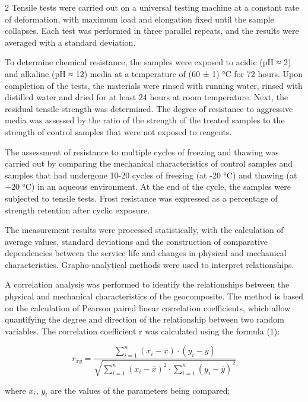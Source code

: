 \begin{multicols}{2}
Tensile tests were carried out on a universal testing machine at a
constant rate of deformation, with maximum load and elongation fixed
until the sample collapses. Each test was performed in three parallel
repeats, and the results were averaged with a standard deviation.

To determine chemical resistance, the samples were exposed to acidic (pH
≈ 2) and alkaline (pH ≈ 12) media at a temperature of (60 ± 1) °C for 72
hours. Upon completion of the tests, the materials were rinsed with
running water, rinsed with distilled water and dried for at least 24
hours at room temperature. Next, the residual tensile strength was
determined. The degree of resistance to aggressive media was assessed by
the ratio of the strength of the treated samples to the strength of
control samples that were not exposed to reagents.

The assessment of resistance to multiple cycles of freezing and thawing
was carried out by comparing the mechanical characteristics of control
samples and samples that had undergone 10-20 cycles of freezing (at -20
°C) and thawing (at +20 °C) in an aqueous environment. At the end of the
cycle, the samples were subjected to tensile tests. Frost resistance was
expressed as a percentage of strength retention after cyclic exposure.

The measurement results were processed statistically, with the
calculation of average values, standard deviations and the construction
of comparative dependencies between the service life and changes in
physical and mechanical characteristics. Grapho-analytical methods were
used to interpret relationships.

A correlation analysis was performed to identify the relationships
between the physical and mechanical characteristics of the geocomposite.
The method is based on the calculation of Pearson paired linear
correlation coefficients, which allow quantifying the degree and
direction of the relationship between two random variables. The
correlation coefficient r was calculated using the
formula (1):

\begin{equation}
r_{xy} = \frac{\sum_{i = 1}^{n}{\left( x_{i} - \overline{x} \right) \cdot \left( y_{i} - \overline{y} \right)}}{\sqrt{\sum_{i = 1}^{n}{\left( x_{i} - \overline{x} \right)^{2} \cdot}\sum_{i = 1}^{n}\left( y_{i} - \overline{y} \right)^{2}}}
\end{equation}

where \(x_i\), \(y_i\) are the values of the
parameters being compared;


\end{multicols}
